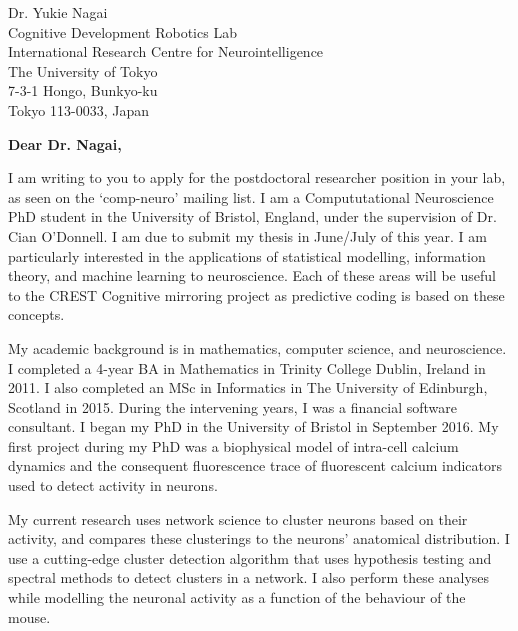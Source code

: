 \documentclass[11pt]{letter} %
\begin{document}

\begin{letter}{Dr. Yukie Nagai \\ 
  Cognitive Development Robotics Lab \\ 
  International Research Centre for Neurointelligence \\
  The University of Tokyo \\
  7-3-1 Hongo, Bunkyo-ku \\
  Tokyo 113-0033, Japan} %


  \opening{\textbf{Dear Dr. Nagai,}}
  
  I am writing to you to apply for the postdoctoral researcher position in your lab, as seen on the `comp-neuro' mailing list. I am a Compututational Neuroscience PhD student in the University of Bristol, England, under the supervision of Dr. Cian O'Donnell. I am due to submit my thesis in June/July of this year. I am particularly interested in the applications of statistical modelling, information theory, and machine learning to neuroscience. Each of these areas will be useful to the CREST Cognitive mirroring project as predictive coding is based on these concepts.

  My academic background is in mathematics, computer science, and neuroscience. I completed a 4-year BA in Mathematics in Trinity College Dublin, Ireland in 2011. I also completed an MSc in Informatics in The University of Edinburgh, Scotland in 2015. During the intervening years, I was a financial software consultant. I began my PhD in the University of Bristol in September 2016. My first project during my PhD was a biophysical model of intra-cell calcium dynamics and the consequent fluorescence trace of fluorescent calcium indicators used to detect activity in neurons. 

  My current research uses network science to cluster neurons based on their activity, and compares these clusterings to the neurons' anatomical distribution. I use a cutting-edge cluster detection algorithm that uses hypothesis testing and spectral methods to detect clusters in a network. I also perform these analyses while modelling the neuronal activity as a function of the behaviour of the mouse.


\end{letter}
\end{document}
